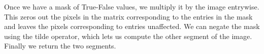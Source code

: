 Once we have a mask of True-False values, we multiply it by the image entrywise. This zeros out the pixels in the matrix corresponding to the  entries in the mask and leaves the pixels corresponding to  entries unaffected. We can negate the mask using the tilde operator, which lets us compute the other segment of the image. Finally we return the two segments.

